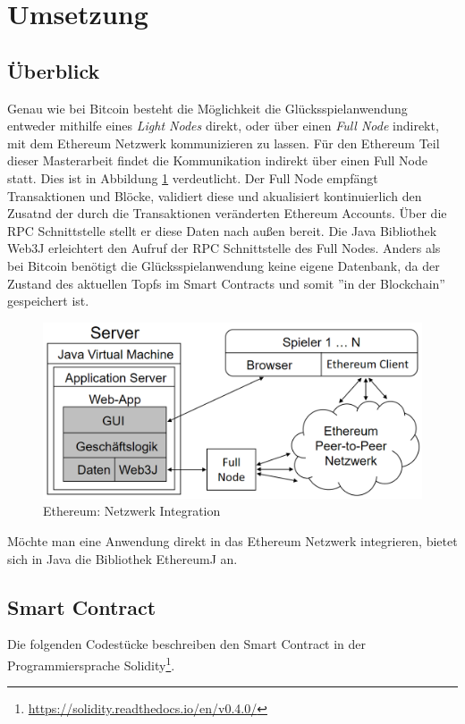 \section{Umsetzung}
\subsection{Überblick}
Genau wie bei Bitcoin besteht die Möglichkeit die Glücksspielanwendung entweder mithilfe eines \textit{Light Nodes} direkt, oder über einen \textit{Full Node} indirekt, mit dem Ethereum Netzwerk kommunizieren zu lassen. Für den Ethereum Teil dieser Masterarbeit findet die Kommunikation indirekt über einen Full Node statt. Dies ist in Abbildung \ref{fig:eth_anwendung_aufbau} verdeutlicht. Der Full Node empfängt Transaktionen und Blöcke, validiert diese und akualisiert kontinuierlich den Zusatnd der durch die Transaktionen veränderten Ethereum Accounts. Über die RPC Schnittstelle stellt er diese Daten nach außen bereit. Die Java Bibliothek Web3J \cite{web3j} erleichtert den Aufruf der RPC Schnittstelle des Full Nodes. Anders als bei Bitcoin benötigt die Glücksspielanwendung keine eigene Datenbank, da der Zustand des aktuellen Topfs im Smart Contracts und somit ''in der Blockchain'' gespeichert ist.
\begin{figure}[H]
\centering
\includegraphics[width=1\linewidth]{Figures/umsetzung_eth/anwendung_aufbau}
\decoRule
\caption{Ethereum: Netzwerk Integration}
\label{fig:eth_anwendung_aufbau}
\end{figure}

Möchte man eine Anwendung direkt in das Ethereum Netzwerk integrieren, bietet sich in Java die Bibliothek EthereumJ \cite{ethereumj} an. 

\subsection{Smart Contract}
Die folgenden Codestücke beschreiben den  Smart Contract in der Programmiersprache Solidity\footnote{\url{https://solidity.readthedocs.io/en/v0.4.0/}}.

